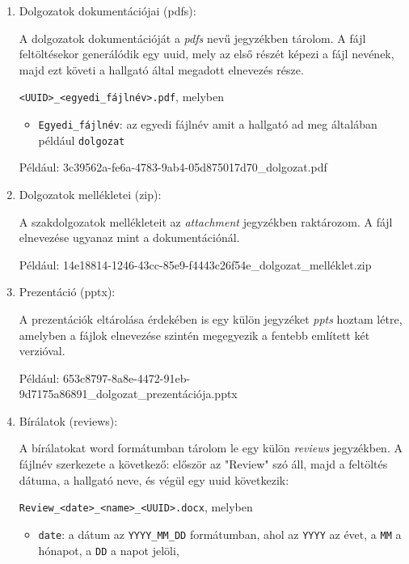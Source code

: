 \begin{enumerate}

\item{Dolgozatok dokumentációjai (pdfs):}

A dolgozatok dokumentációját a \textit{pdfs} nevű jegyzékben tárolom. 
A fájl feltöltésekor generálódik egy uuid, mely az első részét képezi a fájl nevének, majd ezt követi a hallgató által megadott elnevezés része.

\texttt{<UUID>\_<egyedi\_fájlnév>.pdf}, melyben

\begin{itemize}

\item \texttt{Egyedi\_fájlnév}: az egyedi fájlnév amit a hallgató ad meg általában például \texttt{dolgozat}

\end{itemize}

Például: 3c39562a-fe6a-4783-9ab4-05d875017d70\_dolgozat.pdf


\item{Dolgozatok mellékletei (zip):}

A szakdolgozatok mellékleteit az \textit{attachment} jegyzékben raktározom. A fájl elnevezése ugyanaz mint a dokumentációnál.

Például: 14e18814-1246-43cc-85e9-f4443c26f54e\_dolgozat\_melléklet.zip

\item{Prezentáció (pptx):}

A prezentációk eltárolása érdekében is egy külön jegyzéket \textit{ppts} hoztam létre, amelyben a fájlok elnevezése szintén megegyezik a fentebb említett két verzióval.

Például: 653c8797-8a8e-4472-91eb-9d7175a86891\_dolgozat\_prezentációja.pptx

\item{Bírálatok (reviews):}

A bírálatokat word formátumban tárolom le egy külön \textit{reviews} jegyzékben. A fájlnév szerkezete a következő: először az "Review" szó áll, majd a feltöltés dátuma, a hallgató neve, és végül egy uuid következik:

\texttt{Review\_<date>\_<name>\_<UUID>.docx}, melyben

\begin{itemize}
\item \texttt{date}: a dátum az \texttt{YYYY\_MM\_DD} formátumban, ahol az \texttt{YYYY} az évet, a \texttt{MM} a hónapot, a \texttt{DD} a napot jelöli,



\end{itemize}
\end{enumerate}

